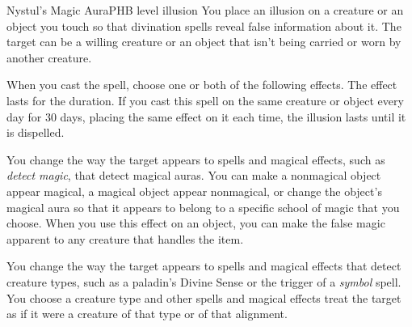 \begin{spell}{Nystul's Magic Aura}{PHB}{ level illusion}
{
}
You place an illusion on a creature or an object
you touch so that divination spells reveal false
information about it. The target can be a willing
creature or an object that isn't being carried or worn
by another creature.

When you cast the spell, choose one or both of the
following effects. The effect lasts for the duration. If you
cast this spell on the same creature or object every day
for 30 days, placing the same effect on it each time, the
illusion lasts until it is dispelled.

 You change the way the target appears
to spells and magical effects, such as \emph{detect magic},
that detect magical auras. You can make a nonmagical
object appear magical, a magical object appear
nonmagical, or change the object's magical aura so that
it appears to belong to a specific school of magic that
you choose. When you use this effect on an object, you
can make the false magic apparent to any creature that
handles the item.

 You change the way the target appears to spells
and magical effects that detect creature types, such as a
paladin's Divine Sense or the trigger of a \emph{symbol} spell.
You choose a creature type and other spells and magical
effects treat the target as if it were a creature of that
type or of that alignment.
\end{spell}
